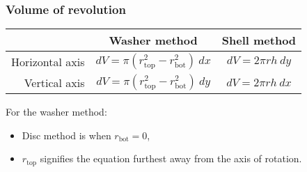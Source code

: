 \documentclass[main.tex]{subfiles}
\begin{document}
\begin{multicols}{2}
	\subsubsection*{Volume of revolution}
	\begin{tabular}{r c c}
		\toprule
		{} & Washer method & Shell method \\ \hline
		Horizontal axis & \(\displaystyle dV = \pi (r^2_{\mathrm{top}} - r^2_{\mathrm{bot}}) \ dx\) & \(\displaystyle dV = 2 \pi rh \ dy\) \\ \hline
		Vertical axis & \(\displaystyle dV = \pi (r^2_{\mathrm{top}} - r^2_{\mathrm{bot}}) \ dy\) & \(\displaystyle dV = 2 \pi rh \ dx\) \\
		\bottomrule
	\end{tabular}

	For the washer method:
	\begin{itemize}
		\item Disc method is when \(\displaystyle r_\mathrm{bot} = 0\),
		\item \(r_\mathrm{top}\) signifies the equation furthest away from the axis of rotation.
	\end{itemize}


\end{multicols}
\end{document}
